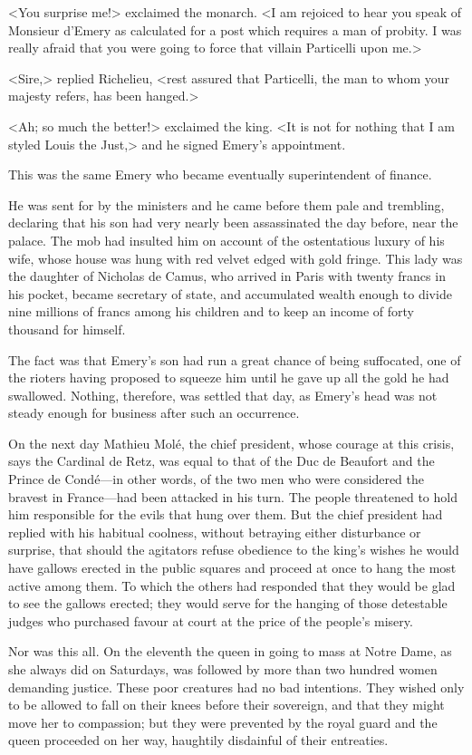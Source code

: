 <You surprise me!> exclaimed the monarch. <I am rejoiced to hear you speak of Monsieur d'Emery as calculated for a post which requires a man of probity. I was really afraid that you were going to force that villain Particelli upon me.>

<Sire,> replied Richelieu, <rest assured that Particelli, the man to whom your majesty refers, has been hanged.>

<Ah; so much the better!> exclaimed the king. <It is not for nothing that I am styled Louis the Just,> and he signed Emery's appointment.

This was the same Emery who became eventually superintendent of finance.

He was sent for by the ministers and he came before them pale and trembling, declaring that his son had very nearly been assassinated the day before, near the palace. The mob had insulted him on account of the ostentatious luxury of his wife, whose house was hung with red velvet edged with gold fringe. This lady was the daughter of Nicholas de Camus, who arrived in Paris with twenty francs in his pocket, became secretary of state, and accumulated wealth enough to divide nine millions of francs among his children and to keep an income of forty thousand for himself.

The fact was that Emery's son had run a great chance of being suffocated, one of the rioters having proposed to squeeze him until he gave up all the gold he had swallowed. Nothing, therefore, was settled that day, as Emery's head was not steady enough for business after such an occurrence.

On the next day Mathieu Molé, the chief president, whose courage at this crisis, says the Cardinal de Retz, was equal to that of the Duc de Beaufort and the Prince de Condé—in other words, of the two men who were considered the bravest in France—had been attacked in his turn. The people threatened to hold him responsible for the evils that hung over them. But the chief president had replied with his habitual coolness, without betraying either disturbance or surprise, that should the agitators refuse obedience to the king's wishes he would have gallows erected in the public squares and proceed at once to hang the most active among them. To which the others had responded that they would be glad to see the gallows erected; they would serve for the hanging of those detestable judges who purchased favour at court at the price of the people's misery.

Nor was this all. On the eleventh the queen in going to mass at Notre Dame, as she always did on Saturdays, was followed by more than two hundred women demanding justice. These poor creatures had no bad intentions. They wished only to be allowed to fall on their knees before their sovereign, and that they might move her to compassion; but they were prevented by the royal guard and the queen proceeded on her way, haughtily disdainful of their entreaties.

